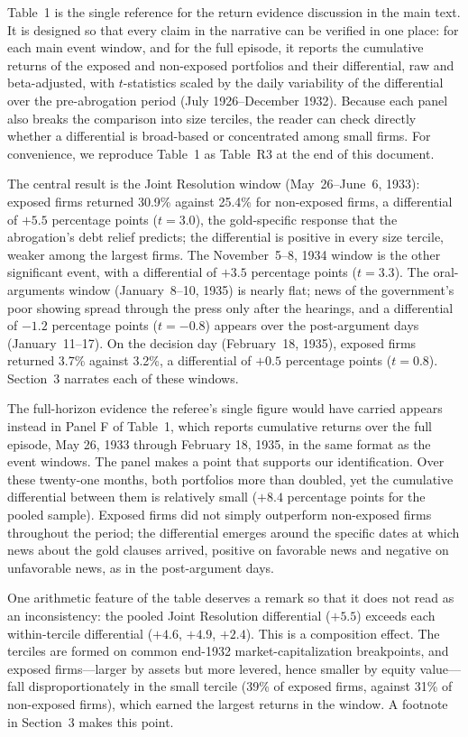 \medskip
\noindent Table~1 is the single reference for the return evidence discussion in the main text. It is designed so that every claim in the narrative can be verified in one place: for each main event window, and for the full episode, it reports the cumulative returns of the exposed and non-exposed portfolios and their differential, raw and beta-adjusted, with $t$-statistics scaled by the daily variability of the differential over the pre-abrogation period (July 1926--December 1932). Because each panel also breaks the comparison into size terciles, the reader can check directly whether a differential is broad-based or concentrated among small firms. For convenience, we reproduce Table~1 as Table~R3 at the end of this document.

\medskip
\noindent The central result is the Joint Resolution window (May~26--June~6, 1933): exposed firms returned 30.9\% against 25.4\% for non-exposed firms, a differential of $+5.5$ percentage points ($t = 3.0$), the gold-specific response that the abrogation's debt relief predicts; the differential is positive in every size tercile, weaker among the largest firms. The November~5--8, 1934 window is the other significant event, with a differential of $+3.5$ percentage points ($t = 3.3$). The oral-arguments window (January~8--10, 1935) is nearly flat; news of the government's poor showing spread through the press only after the hearings, and a differential of $-1.2$ percentage points ($t = -0.8$) appears over the post-argument days (January~11--17). On the decision day (February~18, 1935), exposed firms returned 3.7\% against 3.2\%, a differential of $+0.5$ percentage points ($t = 0.8$). Section~3 narrates each of these windows.

\medskip
\noindent The full-horizon evidence the referee's single figure would have carried appears instead in Panel F of Table~1, which reports cumulative returns over the full episode, May 26, 1933 through February 18, 1935, in the same format as the event windows. The panel makes a point that supports our identification. Over these twenty-one months, both portfolios more than doubled, yet the cumulative differential between them is relatively small ($+8.4$ percentage points for the pooled sample). Exposed firms did not simply outperform non-exposed firms throughout the period; the differential emerges around the specific dates at which news about the gold clauses arrived, positive on favorable news and negative on unfavorable news, as in the post-argument days.

\medskip
\noindent One arithmetic feature of the table deserves a remark so that it does not read as an inconsistency: the pooled Joint Resolution differential ($+5.5$) exceeds each within-tercile differential ($+4.6$, $+4.9$, $+2.4$). This is a composition effect. The terciles are formed on common end-1932 market-capitalization breakpoints, and exposed firms---larger by assets but more levered, hence smaller by equity value---fall disproportionately in the small tercile (39\% of exposed firms, against 31\% of non-exposed firms), which earned the largest returns in the window. A footnote in Section~3 makes this point.

